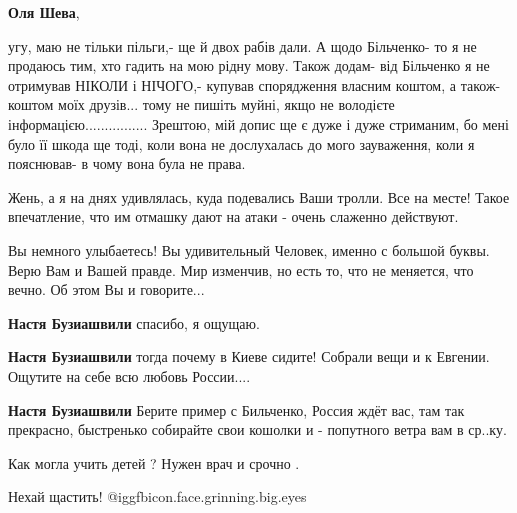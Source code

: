 \begin{itemize}
\begin{itemize}
\textbf{Оля Шева}, 

угу, маю не тільки пільги,- ще й двох рабів дали. А щодо Більченко- то я не
продаюсь тим, хто гадить на мою рідну мову. Також додам- від Більченко я не
отримував НІКОЛИ і НІЧОГО,- купував спорядження власним коштом, а також- коштом
моїх друзів... тому не пишіть муйні, якщо не володієте
інформацією................ Зрештою, мій допис ще є дуже і дуже стриманим, бо
мені було її шкода ще тоді, коли вона не дослухалась до мого зауваження, коли я
пояснював- в чому вона була не права.

\end{itemize} %


Жень, а я на днях удивлялась, куда подевались Ваши тролли. Все на месте! Такое
впечатление, что им отмашку дают на атаки - очень слаженно действуют.



Вы немного улыбаетесь! Вы удивительный Человек, именно с большой буквы. Верю
Вам и Вашей правде. Мир изменчив, но есть то, что не меняется, что вечно. Об
этом Вы и говорите...

\begin{itemize} %
\textbf{Настя Бузиашвили} спасибо, я ощущаю.

\textbf{Настя Бузиашвили} тогда почему в Киеве сидите! Собрали вещи и к Евгении. Ощутите на себе всю любовь России....

\textbf{Настя Бузиашвили} Берите пример с Бильченко, Россия ждёт вас, там так прекрасно, быстренько собирайте свои кошолки и - попутного ветра вам в ср..ку.
\end{itemize} %

Как могла учить детей ? Нужен врач и срочно .

Нехай щастить!  @igg{fbicon.face.grinning.big.eyes} 



\end{itemize}
